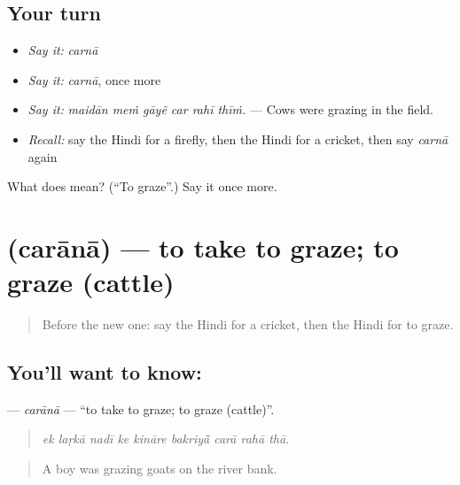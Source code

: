 \subsection*{Your turn}
\begin{itemize}
\raggedright
  \item \emph{Say it:} \emph{carnā}
  \item \emph{Say it:} \emph{carnā}, once more
  \item \emph{Say it:} \emph{maidān meṁ gāyẽ car rahī thīṁ.} — Cows were grazing in the field.
  \item \emph{Recall:} say the Hindi for a firefly, then the Hindi for a cricket, then say \emph{carnā} again
\end{itemize}

\begin{tcolorbox}[breakable,colback=teal!4,colframe=teal!35!black,title={Before you move on}]
What does  mean? (\textquotedblleft{}To graze\textquotedblright{}.) Say it once more.
\end{tcolorbox}
\section[\texorpdfstring{\hi{चराना} (carānā)}{चराना (carānā)}]{ (carānā) — to take to graze; to graze (cattle)}

\label{lesson:HI-C449-carana}



\begin{quote}
Before the new one: say the Hindi for a cricket, then the Hindi for to graze.
\end{quote}

\subsection*{You'll want to know: }
\textbf{} — \emph{carānā} — \textquotedblleft{}to take to graze; to graze (cattle)\textquotedblright{}.

\begin{quote}
        
\end{quote}

\begin{quote}
\emph{ek laṛkā nadī ke kināre bakriyā̃ carā rahā thā.}
\end{quote}

\begin{quote}
A boy was grazing goats on the river bank.
\end{quote}

